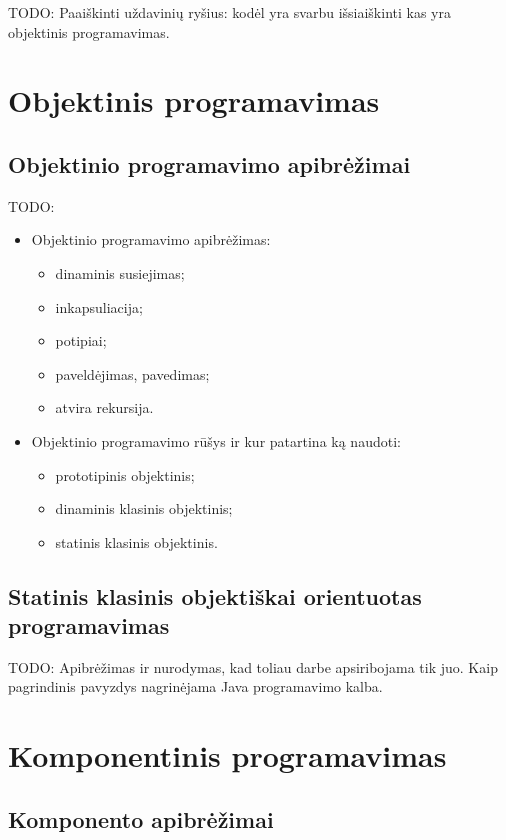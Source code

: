 TODO: Paaiškinti uždavinių ryšius: kodėl yra svarbu išsiaiškinti kas
yra objektinis programavimas.

\chapter{Objektinis programavimas}

\section{Objektinio programavimo apibrėžimai}

TODO:
\begin{itemize}
  \item Objektinio programavimo apibrėžimas:
    \begin{itemize}
      \item dinaminis susiejimas;
      \item inkapsuliacija;
      \item potipiai;
      \item paveldėjimas, pavedimas;
      \item atvira rekursija.
    \end{itemize}
  \item Objektinio programavimo rūšys ir kur patartina ką naudoti:
    \begin{itemize}
      \item prototipinis objektinis;
      \item dinaminis klasinis objektinis;
      \item statinis klasinis objektinis.
    \end{itemize}
\end{itemize}

\section{Statinis klasinis objektiškai orientuotas programavimas}

TODO: Apibrėžimas ir nurodymas, kad toliau darbe apsiribojama tik juo.
Kaip pagrindinis pavyzdys nagrinėjama Java programavimo kalba.

\chapter{Komponentinis programavimas}

\section{Komponento apibrėžimai}

